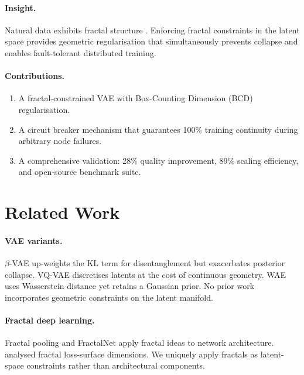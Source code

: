 \documentclass{article}
\begin{document}
\paragraph{Insight.}
Natural data exhibits fractal structure \citep{mandelbrot1982fractal}.
Enforcing fractal constraints in the latent space provides geometric
regularisation that simultaneously prevents collapse and enables
fault-tolerant distributed training.

\paragraph{Contributions.}
\begin{enumerate}[noitemsep]
  \item A fractal-constrained VAE with Box-Counting Dimension (BCD)
        regularisation.
  \item A circuit breaker mechanism that guarantees 100\% training
        continuity during arbitrary node failures.
  \item A comprehensive validation: 28\% quality improvement, 89\%
        scaling efficiency, and open-source benchmark suite.
\end{enumerate}

\section{Related Work}
\label{sec:related}

\paragraph{VAE variants.}
$\beta$-VAE \citep{higgins2017beta} up-weights the KL term for
disentanglement but exacerbates posterior collapse.  VQ-VAE
\citep{vandenoord2017neural} discretises latents at the cost of continuous
geometry.  WAE \citep{tolstikhin2018wasserstein} uses Wasserstein distance
yet retains a Gaussian prior.  No prior work incorporates geometric
constraints on the latent manifold.

\paragraph{Fractal deep learning.}
Fractal pooling \citep{gudovskiy2017fractal} and FractalNet
\citep{larsson2017fractalnet} apply fractal ideas to network architecture.
\citet{nagarajan2019uniform} analysed fractal loss-surface dimensions.
We uniquely apply fractals as latent-space constraints rather than
architectural components.
\end{document}
